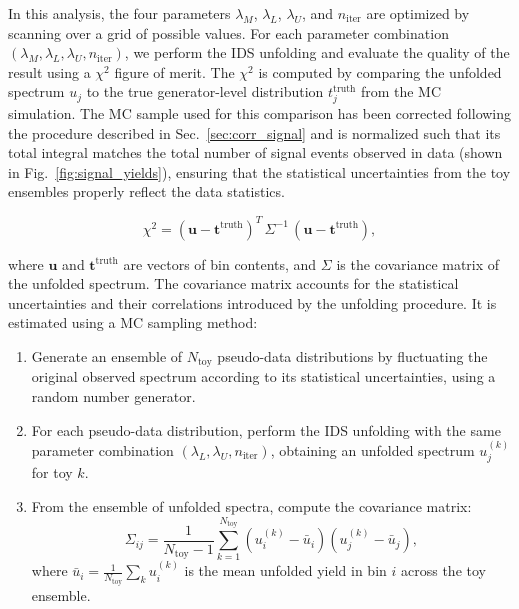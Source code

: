 In this analysis, the four parameters $\lambda_M$, $\lambda_L$, $\lambda_U$,
and $n_{\text{iter}}$ are optimized by scanning over a grid of possible values.
For each parameter combination $(\lambda_M, \lambda_L, \lambda_U,
    n_{\text{iter}})$, we perform the IDS unfolding and evaluate the quality of the
result using a $\chi^2$ figure of merit. The $\chi^2$ is computed by comparing
the unfolded spectrum $u_j$ to the true generator-level distribution
$t_j^{\text{truth}}$ from the MC simulation. The MC sample used for this
comparison has been corrected following the procedure described in
Sec.~\ref{sec:corr_signal} and is normalized such that its total integral
matches the total number of signal events observed in data (shown in
Fig.~\ref{fig:signal_yields}), ensuring that the statistical uncertainties from
the toy ensembles properly reflect the data statistics.

\begin{equation}
    \chi^2 = \left( \mathbf{u} - \mathbf{t}^{\text{truth}} \right)^T \, \Sigma^{-1} \, \left( \mathbf{u} - \mathbf{t}^{\text{truth}} \right),
    \label{eq:chi2_fom}
\end{equation}

where $\mathbf{u}$ and $\mathbf{t}^{\text{truth}}$ are vectors of bin contents,
and $\Sigma$ is the covariance matrix of the unfolded spectrum. The covariance
matrix accounts for the statistical uncertainties and their correlations
introduced by the unfolding procedure. It is estimated using a MC sampling
method:

\begin{enumerate}
    \item Generate an ensemble of $N_{\text{toy}}$ pseudo-data distributions by
          fluctuating the original observed spectrum according to its statistical
          uncertainties, using a random number generator.
    \item For each pseudo-data distribution, perform the IDS unfolding with the same
          parameter combination $(\lambda_L, \lambda_U, n_{\text{iter}})$, obtaining an
          unfolded spectrum $u_j^{(k)}$ for toy $k$.
    \item From the ensemble of unfolded spectra, compute the covariance matrix:
          \begin{equation}
              \Sigma_{ij} = \frac{1}{N_{\text{toy}} - 1} \sum_{k=1}^{N_{\text{toy}}} \left( u_i^{(k)} - \bar{u}_i \right) \left( u_j^{(k)} - \bar{u}_j \right),
              \label{eq:covariance_mc}
          \end{equation}
          where $\bar{u}_i = \frac{1}{N_{\text{toy}}} \sum_{k} u_i^{(k)}$ is the mean unfolded yield in bin $i$ across the toy ensemble.
\end{enumerate}

